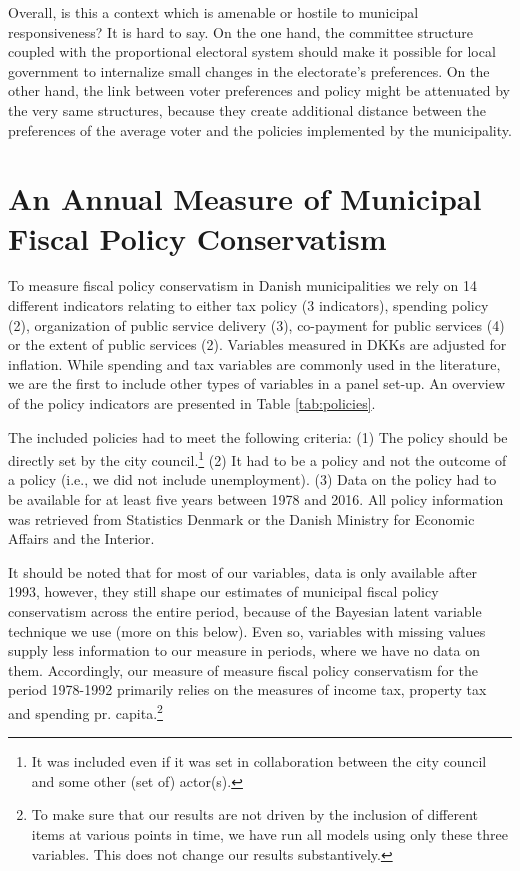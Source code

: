 \documentclass[a4paper,12pt]{article}
\begin{document}
Overall, is this a context which is amenable or hostile to municipal responsiveness? It is hard to say. On the one hand, the committee structure coupled with the proportional electoral system should make it possible for local government to internalize small changes in the electorate's preferences. On the other hand, the link between voter preferences and policy might be attenuated by the very same structures, because they create additional distance between the preferences of the average voter and the policies implemented by the municipality.

\section{An Annual Measure of Municipal Fiscal Policy Conservatism}
To measure fiscal policy conservatism in Danish municipalities we rely on 14 different indicators relating to either tax policy (3 indicators), spending policy (2), organization of public service delivery (3), co-payment for public services (4) or the extent of public services (2). Variables measured in DKKs are adjusted for inflation. While  spending and tax variables are commonly used in the literature, we are the first to include other types of variables in a panel set-up. An overview of the policy indicators are presented in Table \ref{tab:policies}.

The included policies had to meet the following criteria: (1) The policy should be directly set by the city council.\footnote{It was included even if it was set in collaboration between the city council and some other (set of) actor(s).} (2) It had to be a policy and not the outcome of a policy (i.e., we did not include unemployment). (3) Data on the policy had to be available for at least five years between 1978 and 2016. All policy information was retrieved from Statistics Denmark or the Danish Ministry for Economic Affairs and the Interior.



It should be noted that for most of our variables, data is only available after 1993, however, they still shape our estimates of municipal fiscal policy conservatism across the entire period, because of the Bayesian latent variable technique we use (more on this below). Even so, variables with missing values supply less information to our measure in periods, where we have no data on them. Accordingly, our measure of measure fiscal policy conservatism for the period 1978-1992 primarily relies on the measures of income tax, property tax and spending pr. capita.\footnote{To make sure that our results are not driven by the inclusion of different items at various points in time, we have run all models using only these three variables. This does not change our results substantively.}
\end{document}
